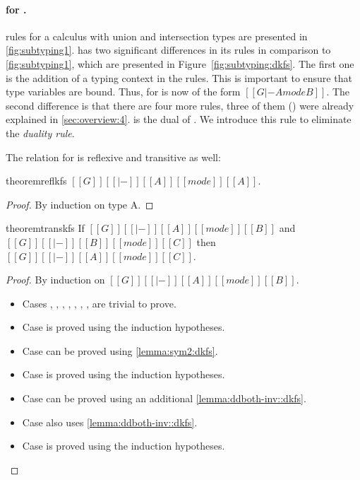 \paragraph{\nameduo for \gfskiu.}
\nameduo rules for a calculus with union and intersection types are
presented in \cref{fig:subtyping1}.  \gfskiu has two significant
differences in its \nameduo rules in comparison to \cref{fig:subtyping1},
which are presented in Figure~\ref{fig:subtyping:dkfs}.
The first one is the addition of a typing context in the \nameduo rules. This is 
important to ensure that type variables are bound.
Thus, \nameduo for
\gfskiu is now of the form $[[G |- A mode B ]]$. The second
difference is that there are four
more rules, three of them () were already 
explained in \cref{sec:overview:4}.  is the dual of . We introduce this rule to eliminate the \emph{duality rule}.

The \nameduo relation for \gfskiu is reflexive and transitive as well:

\begin{restatable}[Reflexivity]{theorem}{reflkfs}
  \label{lemma:refl:kfs}
  $[[G]] [[|-]] [[A]] [[mode]] [[A]]$.
\end{restatable}

\begin{proof}
By induction on type A. 
\end{proof}

\begin{restatable}[Transitivity]{theorem}{transkfs}
  \label{lemma:trans:kfs}
  If $[[G]] [[|-]] [[A]] [[mode]] [[B]]$ and $[[G]] [[|-]] [[B]] [[mode]] [[C]]$ then $[[G]] [[|-]] [[A]] [[mode]] [[C]]$.
\end{restatable}

\begin{proof}
By induction on $[[G]] [[|-]] [[A]] [[mode]] [[B]]$. 
\begin{itemize}
  \item{Cases , , , , , , ,  are trivial to prove.}
  \item{Case  is proved using the induction hypotheses.}
  \item{Case  can be proved using \cref{lemma:sym2:dkfs}.}
  \item{Case  is proved using the induction hypotheses.}
  \item{Case  can be proved using an additional \cref{lemma:ddboth-inv::dkfs}.}
  \item{Case  also uses \cref{lemma:ddboth-inv::dkfs}.}
  \item{Case  is proved using the induction hypotheses.}
\end{itemize}
\end{proof}

